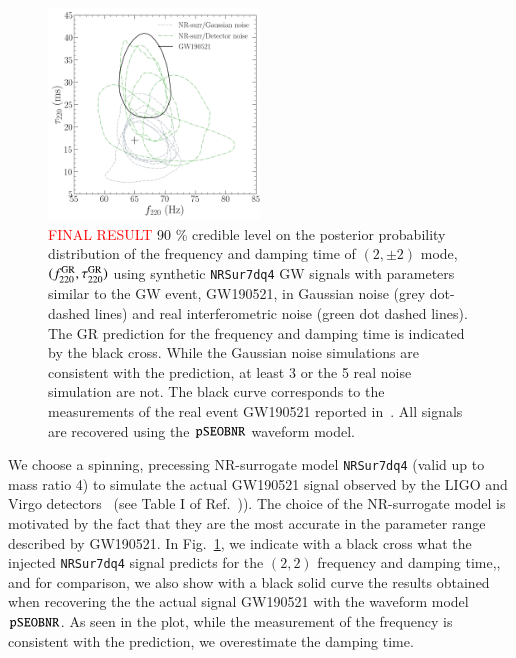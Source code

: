 \begin{figure}
\begin{center}
        \includegraphics[width=0.5\textwidth]{figures/S190521g_swinjs.png}
        \caption{\textcolor{red}{FINAL RESULT} 90 \% credible level on the posterior probability distribution of the frequency and damping time of $(2,\pm 2)$ mode, $(f ^{\text{GR}}_{\text{220}}, \tau ^{\text{GR}}_{\text{220}})$ using synthetic \texttt{NRSur7dq4} GW signals with parameters similar to the GW event, GW190521, in Gaussian noise (grey dot-dashed lines) and real interferometric noise (green dot dashed lines). The GR prediction for the frequency and damping time is indicated by the black cross. While the Gaussian noise simulations are consistent with the prediction, at least 3 or the 5 real noise simulation are not. The black curve corresponds to the measurements of the real event GW190521 reported in~\cite{Abbott:2020jks}. All signals are recovered using the $\texttt{pSEOBNR}$ waveform model.}
        \label{fig:21g_systematics}
\end{center}
\end{figure}

We choose a spinning, precessing NR-surrogate model \texttt{NRSur7dq4} (valid up to mass ratio 4) to simulate the actual GW190521 signal observed by the LIGO and Virgo detectors~\cite{Abbott:2020tfl} (see Table I of Ref.~\cite{Abbott:2020tfl})). The choice of the  NR-surrogate model is motivated by the fact that they are the most accurate in the parameter range described by GW190521. In Fig.~\ref{fig:21g_systematics}, we indicate with a black cross what the injected \texttt{NRSur7dq4} signal predicts for the $(2,2)$ frequency and damping time,, and for comparison, we also show with a black solid curve the results obtained when recovering the the actual signal GW190521 with the waveform model $\texttt{pSEOBNR}$. As seen in the plot, while the measurement of the frequency is consistent with the prediction, we overestimate the damping time.

